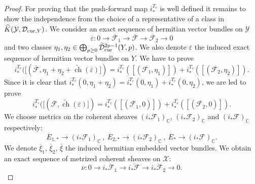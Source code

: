 \documentclass[10pt,twoside]{article}
\numberwithin{equation}{section}
\theoremstyle{plain}
\theoremstyle{definition}
\DeclareMathOperator{\ch}{ch}
\newcommand{\CC}{{\mathbb C}}
\newcommand{\D}{\text{{\rm cur}}}
\begin{document}
\begin{proof}
For proving that the push-forward map $i^{T_{c}}_{\ast}$ is well defined
it remains to show the independence from the choice of a
representative  of a class in $\widehat
K(\mathcal{Y},\mathcal{D}_{\D,Y})$. We consider an exact sequence of
hermitian vector bundles on $\mathcal{Y}$
\begin{displaymath}
\overline{\varepsilon}\colon 0\longrightarrow \overline{\mathcal{F}}_1
\longrightarrow \overline{\mathcal{F}} \longrightarrow
\overline{\mathcal{F}}_2\longrightarrow 0
\end{displaymath}
and two classes $\eta_1, \eta_2\in\bigoplus_{p\geq 0} \widetilde
{\mathcal{D}}_{\D}^{2p-1}(Y,p)$. We also denote $\overline{\varepsilon}$
the induced exact sequence of hermitian vector bundles on $Y$. We
have to prove
\begin{equation}\label{compatrepr}
i^{T_{c}}_{\ast}([(\overline{\mathcal{F}},\eta_1+\eta_2+\widetilde{\ch}
(\overline{\varepsilon})])=i^{T_{c}}_{\ast}([(\overline{\mathcal{F}_1},\eta_1)])
+i^{T_{c}}_{\ast}([(\overline{\mathcal{F}_2},\eta_2)]).
\end{equation}
Since it is clear that $i^{T_{c}}_{\ast}(0,\eta_1+\eta_2)
=i^{T_{c}}_{\ast}(0,\eta_1)
+i^{T_{c}}_{\ast}(0,\eta_2)$, we are led to prove
\begin{equation}\label{compatrepr2}
i^{T_{c}}_{\ast}([(\overline{\mathcal{F}},\widetilde{\ch}
(\overline{\varepsilon})])=i^{T_{c}}_{\ast}([(\overline{\mathcal{F}_1},0)])
+i^{T_{c}}_{\ast}([(\overline{\mathcal{F}_2},0)]).
\end{equation}
We choose metrics on the coherent sheaves
$(i_{\ast}\mathcal{F}_1)_{\CC}$, $(i_{\ast}\mathcal{F}_2)_{\CC}$ and
$(i_{\ast}\mathcal{F})_{\CC}$ respectively:
\begin{displaymath}
\overline{E}_{1,\ast}\longrightarrow (i_{\ast}\mathcal{F}_1)_{\CC}\
,\ \overline{E}_{2,\ast}\longrightarrow
(i_{\ast}\mathcal{F}_2)_{\CC}\ ,\ \overline{E}_{\ast}\longrightarrow
(i_{\ast}\mathcal{F})_{\CC}.
\end{displaymath}
We denote $\overline{\xi}_1$, $\overline{\xi}_2$, $\overline{\xi}$
the induced hermitian embedded vector bundles. We obtain an exact
sequence of metrized coherent sheaves on $\mathcal{X}$:
\begin{displaymath}
\overline{\nu}\colon 0\longrightarrow \overline{i_{\ast}\mathcal{F}_{1}}
\longrightarrow \overline{i_{\ast}\mathcal{F}} \longrightarrow
\overline{i_{\ast}\mathcal{F}_{2}} \longrightarrow 0.
\end{displaymath}


\end{proof}
\end{document}
